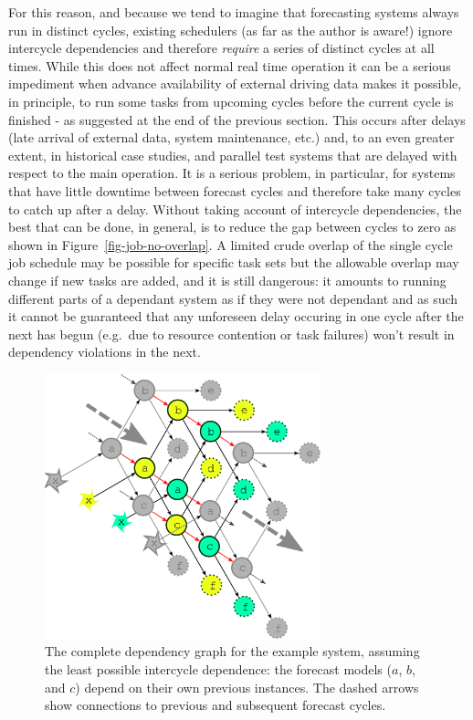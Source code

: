 \documentclass[11pt,a4paper]{article}
\begin{document}
For this reason, and because we tend to imagine that forecasting systems
always run in distinct cycles, existing schedulers (as far as the author
is aware!) ignore intercycle dependencies and therefore {\em require} a
series of distinct cycles at all times. While this does not affect
normal real time operation it can be a serious impediment when advance
availability of external driving data makes it possible, in principle,
to run some tasks from upcoming cycles before the current cycle is
finished - as suggested at the end of the previous section. This occurs
after delays (late arrival of external data, system maintenance, etc.)
and, to an even greater extent, in historical case studies, and parallel
test systems that are delayed with respect to the main operation. It is
a serious problem, in particular, for systems that have little downtime
between forecast cycles and therefore take many cycles to catch up
after a delay. Without taking account of intercycle dependencies, the
best that can be done, in general, is to reduce the gap between cycles
to zero as shown in Figure~\ref{fig-job-no-overlap}. A limited crude
overlap of the single cycle job schedule may be possible for specific
task sets but the allowable overlap may change if new tasks are added,
and it is still dangerous: it amounts to running different parts of a
dependant system as if they were not dependant and as such it cannot be
guaranteed that any unforeseen delay occuring in one cycle after the 
next has begun (e.g.\ due to resource contention or task failures) won't
result in dependency violations in the next.

\begin{figure}
    \begin{center}
        \includegraphics[width=8cm]{inkscape-svg/dep-multi-cycle} 
    \end{center}
    \caption[Complete multicycle dependency graph]{\small The complete
    dependency graph for the example system, assuming the least possible
    intercycle dependence: the forecast models ($a$, $b$, and $c$)
    depend on their own previous instances. The dashed arrows show
    connections to previous and subsequent forecast cycles.} 
    \label{fig-dep-multi}
\end{figure}
\end{document}
